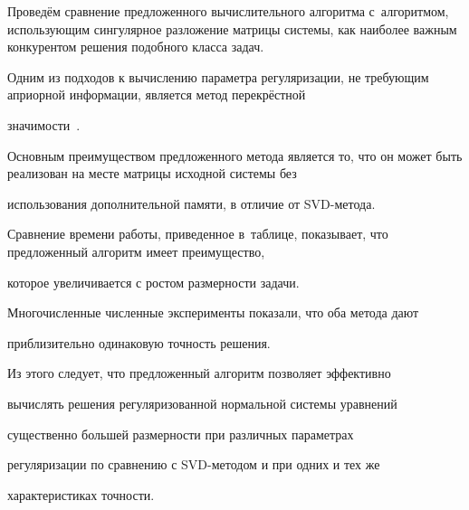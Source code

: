 Проведём сравнение предложенного вычислительного алгоритма с~алгоритмом, использующим сингулярное разложение матрицы системы, как наиболее важным конкурентом решения подобного класса задач.



Одним из подходов к вычислению параметра регуляризации, не требующим априорной информации, является метод перекрёстной

значимости~{\cite{dolishzhdanov:bib:bjorck}}.



Основным преимуществом предложенного метода является то, что он может быть реализован на месте матрицы исходной системы без

использования дополнительной памяти, в отличие от SVD-метода.



Сравнение времени работы, приведенное в~таблице, показывает, что предложенный алгоритм имеет преимущество,

которое увеличивается с ростом размерности задачи.



Многочисленные численные эксперименты показали, что оба метода дают

приблизительно одинаковую точность решения.

Из этого следует, что предложенный алгоритм позволяет эффективно

вычислять решения регуляризованной нормальной системы уравнений

существенно большей размерности при различных параметрах

регуляризации по сравнению с SVD-методом и при одних и тех же

характеристиках точности.



